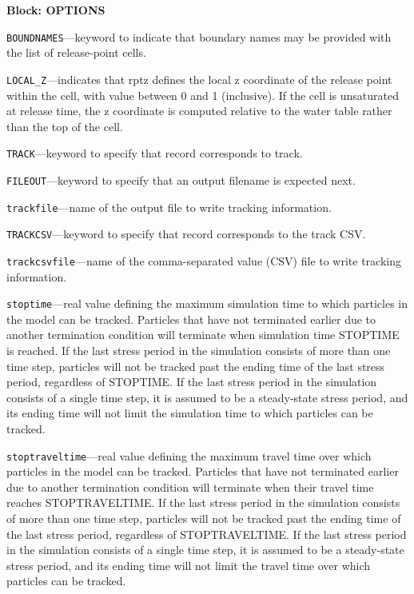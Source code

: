
\item \textbf{Block: OPTIONS}

\begin{description}
\item \texttt{BOUNDNAMES}---keyword to indicate that boundary names may be provided with the list of release-point cells.

\item \texttt{LOCAL\_Z}---indicates that rptz defines the local z coordinate of the release point within the cell, with value between 0 and 1 (inclusive).  If the cell is unsaturated at release time, the z coordinate is computed relative to the water table rather than the top of the cell.

\item \texttt{TRACK}---keyword to specify that record corresponds to track.

\item \texttt{FILEOUT}---keyword to specify that an output filename is expected next.

\item \texttt{trackfile}---name of the output file to write tracking information.

\item \texttt{TRACKCSV}---keyword to specify that record corresponds to the track CSV.

\item \texttt{trackcsvfile}---name of the comma-separated value (CSV) file to write tracking information.

\item \texttt{stoptime}---real value defining the maximum simulation time to which particles in the model can be tracked.  Particles that have not terminated earlier due to another termination condition will terminate when simulation time STOPTIME is reached.  If the last stress period in the simulation consists of more than one time step, particles will not be tracked past the ending time of the last stress period, regardless of STOPTIME.  If the last stress period in the simulation consists of a single time step, it is assumed to be a steady-state stress period, and its ending time will not limit the simulation time to which particles can be tracked.

\item \texttt{stoptraveltime}---real value defining the maximum travel time over which particles in the model can be tracked.  Particles that have not terminated earlier due to another termination condition will terminate when their travel time reaches STOPTRAVELTIME.  If the last stress period in the simulation consists of more than one time step, particles will not be tracked past the ending time of the last stress period, regardless of STOPTRAVELTIME.  If the last stress period in the simulation consists of a single time step, it is assumed to be a steady-state stress period, and its ending time will not limit the travel time over which particles can be tracked.


\end{description}
